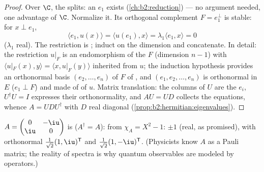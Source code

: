 \begin{proof}
Over $\C$, the  splits: an 
$e_1$ exists (\cref{ch:b2:reduction}) --- no  argument
needed, one advantage of $\C$. Normalize it. Its orthogonal
complement $F = e_1^\perp$ is stable: for $x \perp e_1$,
\[
\langle e_1, u(x)\rangle = \langle u(e_1), x\rangle
= \lambda_1\langle e_1, x\rangle = 0
\]
($\lambda_1$ real). The restriction is ; induct on the
dimension and concatenate. In detail: the restriction $u|_F$ is
an endomorphism of the  $F$ (dimension $n - 1$)
with $\langle u|_F(x), y\rangle = \langle x, u|_F(y)\rangle$
inherited from $u$; the induction hypothesis provides an
orthonormal basis $(e_2, \dots, e_n)$ of $F$ of ,
and $(e_1, e_2, \dots, e_n)$ is orthonormal in $E$ ($e_1 \perp
F$) and made of  of $u$. Matrix translation: the
columns of $U$ are the $e_i$, $U^\dagger U = I$ expresses their
orthonormality, and $AU = UD$ collects the 
equations, whence $A = UDU^\dagger$ with $D$ real diagonal
(\cref{prop:b2:hermitian:eigenvalues}).
\end{proof}

\begin{example}\label{ex:b2:hermitian:pauli}
$A = \begin{pmatrix} 0 & -\iu\\ \iu & 0\end{pmatrix}$ is 
($A^\dagger = A$):  from $\chi_A = X^2 - 1$: $\pm 1$
(real, as promised), with orthonormal 
$\frac{1}{\sqrt2}(1, \iu)^{\mathsf T}$ and $\frac{1}{\sqrt2}(1,
-\iu)^{\mathsf T}$. (Physicists know $A$ as a Pauli matrix; the
reality of  spectra is why quantum observables are modeled
by  operators.)
\end{example}

